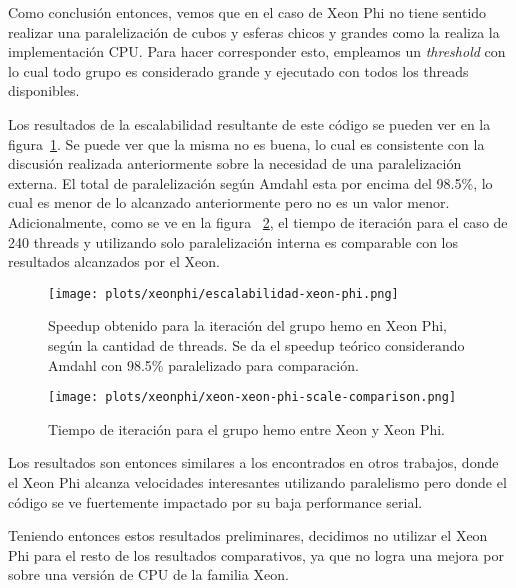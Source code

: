 Como conclusi\'on entonces, vemos que en el caso de Xeon Phi no tiene sentido
realizar una paralelizaci\'on de cubos y esferas chicos y grandes como la realiza
la implementaci\'on CPU. Para hacer corresponder esto, empleamos un \textit{threshold}
con lo cual todo grupo es considerado grande y ejecutado con todos los
threads disponibles.

Los resultados de la escalabilidad resultante de este c\'odigo se pueden ver
en la figura~\ref{fig:xeon-final-scalability}. Se puede ver que la misma no es
buena, lo cual es consistente con la discusi\'on realizada anteriormente sobre
la necesidad de una paralelizaci\'on externa. El total de paralelizaci\'on seg\'un
Amdahl esta por encima del 98.5\%, lo cual es menor de lo alcanzado anteriormente
pero no es un valor menor. Adicionalmente, como se ve en la figura
~\ref{fig:xeon-xeon-phi-parallelized-iteration}, el tiempo de iteraci\'on
para el caso de 240 threads y utilizando solo paralelizaci\'on interna es
comparable con los resultados alcanzados por el Xeon.

\begin{figure}[htbp]
   \centering
   \texttt{[image: plots/xeonphi/escalabilidad-xeon-phi.png]}
   \caption{Speedup obtenido para la iteraci\'on del grupo hemo en Xeon Phi,
   seg\'un la cantidad de threads. Se da el speedup te\'orico considerando Amdahl
   con 98.5\% paralelizado para comparaci\'on.}
   \label{fig:xeon-final-scalability}
\end{figure}

\begin{figure}[htbp]
   \centering
   \texttt{[image: plots/xeonphi/xeon-xeon-phi-scale-comparison.png]}
   \caption{Tiempo de iteraci\'on para el grupo hemo entre Xeon y Xeon Phi.}
   \label{fig:xeon-xeon-phi-parallelized-iteration}
\end{figure}

Los resultados son entonces similares a los encontrados en otros trabajos,
donde el Xeon Phi alcanza velocidades interesantes utilizando paralelismo
pero donde el c\'odigo se ve fuertemente impactado por su baja performance serial.

Teniendo entonces estos resultados preliminares, decidimos no utilizar el Xeon Phi
para el resto de los resultados comparativos, ya que no logra una mejora por sobre
una versi\'on de CPU de la familia Xeon.
